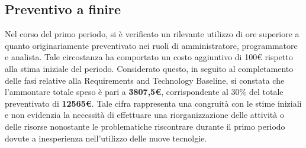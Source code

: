 \subsection{Preventivo a finire}
Nel corso del primo periodo, si è verificato un rilevante utilizzo di ore superiore a quanto originariamente preventivato nei ruoli di amministratore, programmatore e analista. Tale circostanza ha comportato un costo aggiuntivo di 100€ rispetto alla stima iniziale del periodo.
Considerato questo, in seguito al completamento delle fasi relative alla Requirements and Technology Baseline, si constata che l'ammontare totale speso è pari a \textbf{3807,5€}, corrispondente al 30\% del totale preventivato di \textbf{12565€}.
Tale cifra rappresenta una congruità con le stime iniziali e non evidenzia la necessità di effettuare una riorganizzazione delle attività o delle risorse nonostante le problematiche riscontrare durante il primo periodo dovute a inesperienza nell'utilizzo delle nuove tecnolgie.